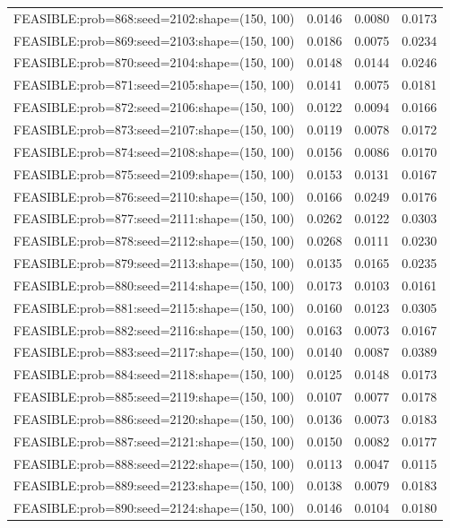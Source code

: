 \begin{longtable}{lccc}
FEASIBLE:prob=868:seed=2102:shape=(150, 100) &   0.0146 & 0.0080 & 0.0173 \\
FEASIBLE:prob=869:seed=2103:shape=(150, 100) &   0.0186 & 0.0075 & 0.0234 \\
FEASIBLE:prob=870:seed=2104:shape=(150, 100) &   0.0148 & 0.0144 & 0.0246 \\
FEASIBLE:prob=871:seed=2105:shape=(150, 100) &   0.0141 & 0.0075 & 0.0181 \\
FEASIBLE:prob=872:seed=2106:shape=(150, 100) &   0.0122 & 0.0094 & 0.0166 \\
FEASIBLE:prob=873:seed=2107:shape=(150, 100) &   0.0119 & 0.0078 & 0.0172 \\
FEASIBLE:prob=874:seed=2108:shape=(150, 100) &   0.0156 & 0.0086 & 0.0170 \\
FEASIBLE:prob=875:seed=2109:shape=(150, 100) &   0.0153 & 0.0131 & 0.0167 \\
FEASIBLE:prob=876:seed=2110:shape=(150, 100) &   0.0166 & 0.0249 & 0.0176 \\
FEASIBLE:prob=877:seed=2111:shape=(150, 100) &   0.0262 & 0.0122 & 0.0303 \\
FEASIBLE:prob=878:seed=2112:shape=(150, 100) &   0.0268 & 0.0111 & 0.0230 \\
FEASIBLE:prob=879:seed=2113:shape=(150, 100) &   0.0135 & 0.0165 & 0.0235 \\
FEASIBLE:prob=880:seed=2114:shape=(150, 100) &   0.0173 & 0.0103 & 0.0161 \\
FEASIBLE:prob=881:seed=2115:shape=(150, 100) &   0.0160 & 0.0123 & 0.0305 \\
FEASIBLE:prob=882:seed=2116:shape=(150, 100) &   0.0163 & 0.0073 & 0.0167 \\
FEASIBLE:prob=883:seed=2117:shape=(150, 100) &   0.0140 & 0.0087 & 0.0389 \\
FEASIBLE:prob=884:seed=2118:shape=(150, 100) &   0.0125 & 0.0148 & 0.0173 \\
FEASIBLE:prob=885:seed=2119:shape=(150, 100) &   0.0107 & 0.0077 & 0.0178 \\
FEASIBLE:prob=886:seed=2120:shape=(150, 100) &   0.0136 & 0.0073 & 0.0183 \\
FEASIBLE:prob=887:seed=2121:shape=(150, 100) &   0.0150 & 0.0082 & 0.0177 \\
FEASIBLE:prob=888:seed=2122:shape=(150, 100) &   0.0113 & 0.0047 & 0.0115 \\
FEASIBLE:prob=889:seed=2123:shape=(150, 100) &   0.0138 & 0.0079 & 0.0183 \\
FEASIBLE:prob=890:seed=2124:shape=(150, 100) &   0.0146 & 0.0104 & 0.0180 \\

\end{longtable}
